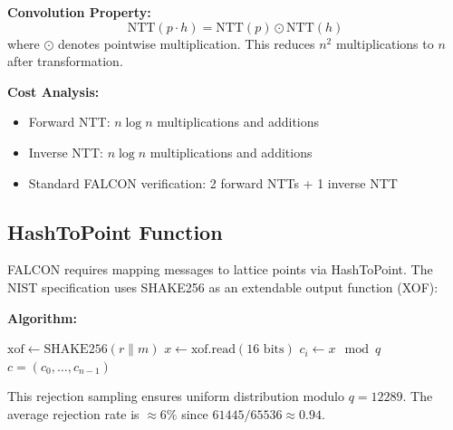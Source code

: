 \textbf{Convolution Property:}
\begin{equation}
\text{NTT}(p \cdot h) = \text{NTT}(p) \odot \text{NTT}(h)
\end{equation}
where $\odot$ denotes pointwise multiplication. This reduces $n^2$ multiplications to $n$ after transformation.

\textbf{Cost Analysis:}
\begin{itemize}
    \item Forward NTT: $n \log n$ multiplications and additions
    \item Inverse NTT: $n \log n$ multiplications and additions
    \item Standard FALCON verification: 2 forward NTTs + 1 inverse NTT
\end{itemize}

\subsection{HashToPoint Function}

FALCON requires mapping messages to lattice points via HashToPoint. The NIST specification uses SHAKE256 as an extendable output function (XOF):

\textbf{Algorithm:}
\begin{algorithmic}[1]
\STATE $\text{xof} \gets \text{SHAKE256}(r \| m)$
    \REPEAT
        \STATE $x \gets \text{xof.read}(16 \text{ bits})$
    \STATE $c_i \gets x \mod q$
\ENDFOR
\RETURN $c = (c_0, \ldots, c_{n-1})$
\end{algorithmic}

This rejection sampling ensures uniform distribution modulo $q = 12289$. The average rejection rate is $\approx 6\%$ since $61445/65536 \approx 0.94$.

